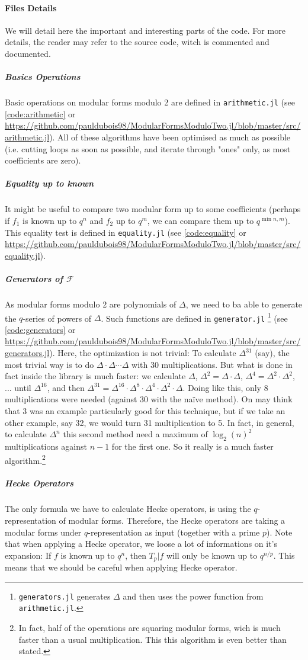 \paragraph{Files Details}
We will detail here the important and interesting parts of the code.
For more details, the reader may refer to the source code, witch is commented and documented.
\subparagraph{Basics Operations}
Basic operations on modular forms modulo 2 are defined in \texttt{arithmetic.jl} (see \ref{code:arithmetic} or \url{https://github.com/pauldubois98/ModularFormsModuloTwo.jl/blob/master/src/arithmetic.jl}).
All of these algorithms have been optimised as much as possible (i.e. cutting loops as soon as possible, and iterate through "ones" only, as most coefficients are zero).
\subparagraph{Equality up to known}
It might be useful to compare two modular form up to some coefficients (perhaps if $f_1$ is known up to $q^n$ and $f_2$ up to $q^m$, we can compare them up to $q^{\min{n,m}}$).
This equality test is defined in \texttt{equality.jl} (see \ref{code:equality} or \url{https://github.com/pauldubois98/ModularFormsModuloTwo.jl/blob/master/src/equality.jl}).
\subparagraph{Generators of $\mathcal{F}$}
As modular forms modulo 2 are polynomials of $\Delta$, we need to ba able to generate the $q$-series of powers of $\Delta$.
Such functions are defined in \texttt{generator.jl} \footnote{\texttt{generators.jl} generates $\Delta$ and then uses the power function from \texttt{arithmetic.jl}.} (see \ref{code:generators} or \url{https://github.com/pauldubois98/ModularFormsModuloTwo.jl/blob/master/src/generators.jl}).
Here, the optimization is not trivial:
To calculate $\Delta^{31}$ (say), the most trivial way is to do $\Delta \cdot \Delta \cdots \Delta$ with 30 multiplications.
But what is done in fact inside the library is much faster: we calculate $\Delta$, $\Delta^2 = \Delta \cdot \Delta$, $\Delta^4 = \Delta^2 \cdot \Delta^2$, ... until $\Delta^{16}$, and then $\Delta^{31} = \Delta^{16} \cdot \Delta^8 \cdot \Delta^4 \cdot \Delta^2 \cdot \Delta$.
Doing like this, only 8 multiplications were needed (against 30 with the naïve method).
On may think that 3 was an example particularly good for this technique, but if we take an other example, say 32, we would turn 31 multiplication to 5.
In fact, in general, to calculate $\Delta^n$ this second method need a maximum of $\log_2(n)^2$ multiplications against $n-1$ for the first one.
So it really is a much faster algorithm.\footnote{In fact, half of the operations are squaring modular forms, wich is much faster than a usual multiplication. This this algorithm is even better than stated.}
\subparagraph{Hecke Operators}
The only formula we have to calculate Hecke operators, is using the $q$-representation of modular forms.
Therefore, the Hecke operators are taking a modular forms under $q$-representation as input (together with a prime $p$).
Note that when applying a Hecke operator, we loose a lot of informations on it's expansion:
If $f$ is known up to $q^n$, then $T_p|f$ will only be known up to $q^{n/p}$.
This means that we should be careful when applying Hecke operator.

